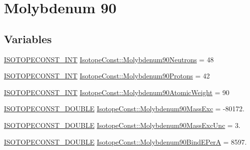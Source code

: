 \hypertarget{group___isotope_const-_molybdenum-_mo90}{}\section{Molybdenum 90}
\label{group___isotope_const-_molybdenum-_mo90}
\subsection*{Variables}
\begin{DoxyCompactItemize}
\item 
\mbox{\hyperlink{group___isotope_const-_macros_ga5f18360b3e99483a35c32d789e62621c}{I\+S\+O\+T\+O\+P\+E\+C\+O\+N\+S\+T\+\_\+\+I\+NT}} \mbox{\hyperlink{group___isotope_const-_molybdenum-_mo90_ga2b5a38a04bf2626dd807b7dbdab38e39}{Isotope\+Const\+::\+Molybdenum90\+Neutrons}} = 48
\item 
\mbox{\hyperlink{group___isotope_const-_macros_ga5f18360b3e99483a35c32d789e62621c}{I\+S\+O\+T\+O\+P\+E\+C\+O\+N\+S\+T\+\_\+\+I\+NT}} \mbox{\hyperlink{group___isotope_const-_molybdenum-_mo90_gaf66b23ab25ccbd79aefcf92239f5d676}{Isotope\+Const\+::\+Molybdenum90\+Protons}} = 42
\item 
\mbox{\hyperlink{group___isotope_const-_macros_ga5f18360b3e99483a35c32d789e62621c}{I\+S\+O\+T\+O\+P\+E\+C\+O\+N\+S\+T\+\_\+\+I\+NT}} \mbox{\hyperlink{group___isotope_const-_molybdenum-_mo90_ga1abc3750eb85320cfef4283eb1a6ad0a}{Isotope\+Const\+::\+Molybdenum90\+Atomic\+Weight}} = 90
\item 
\mbox{\hyperlink{group___isotope_const-_macros_ga8f45a7272ce02c0b4c65c44636ed719a}{I\+S\+O\+T\+O\+P\+E\+C\+O\+N\+S\+T\+\_\+\+D\+O\+U\+B\+LE}} \mbox{\hyperlink{group___isotope_const-_molybdenum-_mo90_ga88ab8fd4129903c24985da05603c4e39}{Isotope\+Const\+::\+Molybdenum90\+Mass\+Exc}} = -\/80172.
\item 
\mbox{\hyperlink{group___isotope_const-_macros_ga8f45a7272ce02c0b4c65c44636ed719a}{I\+S\+O\+T\+O\+P\+E\+C\+O\+N\+S\+T\+\_\+\+D\+O\+U\+B\+LE}} \mbox{\hyperlink{group___isotope_const-_molybdenum-_mo90_ga1ad04fc942d064585d8b53603f0c5fb2}{Isotope\+Const\+::\+Molybdenum90\+Mass\+Exc\+Unc}} = 3.
\item 
\mbox{\hyperlink{group___isotope_const-_macros_ga8f45a7272ce02c0b4c65c44636ed719a}{I\+S\+O\+T\+O\+P\+E\+C\+O\+N\+S\+T\+\_\+\+D\+O\+U\+B\+LE}} \mbox{\hyperlink{group___isotope_const-_molybdenum-_mo90_ga742d3dd9f7f302436b5a13614a6190c4}{Isotope\+Const\+::\+Molybdenum90\+Bind\+E\+PerA}} = 8597.
\item 

\end{DoxyCompactItemize}
